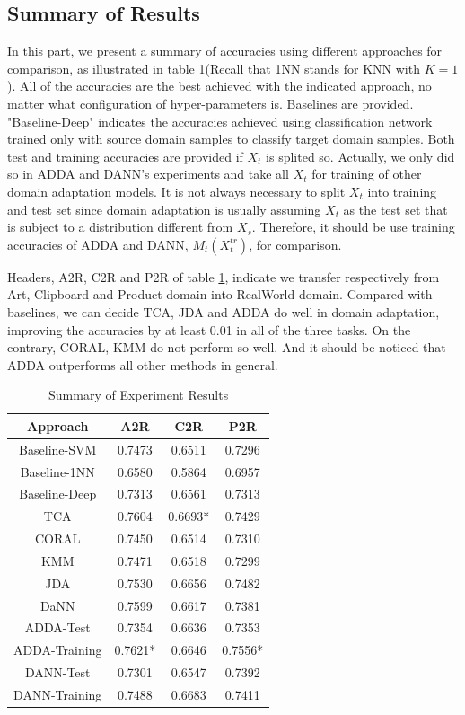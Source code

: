 \documentclass[conference]{IEEEtran}
\begin{document}
\subsection{Summary of Results}
In this part, we present a summary of accuracies using different approaches for comparison, as illustrated in table \ref{tab:ex_sum}(Recall that 1NN stands for KNN with $K=1$). All of the accuracies are the best achieved with the indicated approach, no matter what configuration of hyper-parameters is. Baselines are provided. "Baseline-Deep" indicates the accuracies achieved using classification network trained only with source domain samples to classify target domain samples. Both test and training accuracies are provided if $X_t$ is splited so. Actually, we only did so in ADDA and DANN's experiments and take all $X_t$ for training of other domain adaptation models. It is not always necessary to split $X_t$ into training and test set since domain adaptation is usually assuming $X_t$ as the test set that is subject to a distribution different from $X_s$. Therefore, it should be use training accuracies of ADDA and DANN, $M_t(X^{tr}_t)$, for comparison.

Headers, A2R, C2R and P2R of table \ref{tab:ex_sum}, indicate we transfer respectively from Art, Clipboard and Product domain into RealWorld domain. Compared with baselines, we can decide TCA, JDA and ADDA do well in domain adaptation, improving the accuracies by at least 0.01 in all of the three tasks. On the contrary, CORAL, KMM do not perform so well. And it should be noticed that ADDA outperforms all other methods in general.
 \begin{table}[h]
	\centering
	\caption{Summary of Experiment Results}
	\label{tab:ex_sum}
	\begin{tabular}{cccc}
		\hline
		Approach & A2R & C2R & P2R\\
		\hline
		\hline
		Baseline-SVM &  0.7473 & 0.6511 & 0.7296 \\
        Baseline-1NN &  0.6580 & 0.5864 & 0.6957 \\
        Baseline-Deep &  0.7313 & 0.6561 & 0.7313 \\
		TCA &  0.7604 & 0.6693* & 0.7429 \\
		CORAL &  0.7450 &  0.6514 & 0.7310 \\
        KMM &  0.7471 &  0.6518 & 0.7299 \\
        JDA &  0.7530 &  0.6656 & 0.7482 \\
        DaNN &  0.7599 &  0.6617 & 0.7381 \\
        ADDA-Test &  0.7354 &  0.6636 & 0.7353 \\
        ADDA-Training &  0.7621* &  0.6646 & 0.7556* \\
        DANN-Test &  0.7301 &  0.6547 & 0.7392 \\
        DANN-Training &  0.7488 &  0.6683 & 0.7411 \\
		\hline
	\end{tabular}
\end{table}
\end{document}
